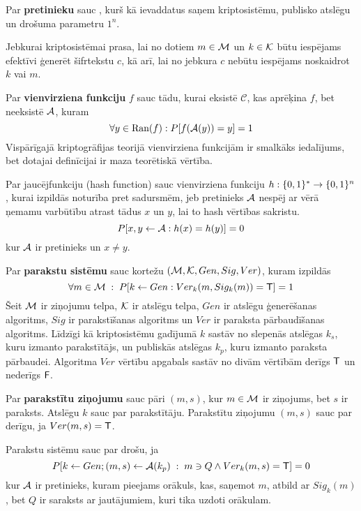Par \textbf{pretinieku} sauc \ppt{}, kurš kā ievaddatus saņem kriptosistēmu, publisko atslēgu un drošuma parametru $1^n$.

Jebkurai kriptosistēmai prasa, lai no dotiem $m\in\mathcal{M}$ un $k\in\mathcal{K}$ būtu iespējams efektīvi ģenerēt šifrtekstu $c$, kā arī, lai no jebkura $c$ nebūtu iespējams noskaidrot $k$ vai $m$.

Par \textbf{vienvirziena funkciju} $f$ sauc tādu, kurai eksistē \ppt{} $\mathcal{C}$, kas aprēķina $f$, bet neeksistē \ppt{} $\mathcal{A}$, kuram 
$$ \forall y \in \text{Ran}(f): P[f(\mathcal{A}(y)) = y] = 1 $$
Vispārīgajā kriptogrāfijas teorijā vienvirziena funkcijām ir smalkāks iedalījums, bet dotajai definīcijai ir maza teorētiskā vērtība.

Par jaucējfunkciju (hash function) sauc vienvirziena funkciju $h: \{0,1\}^* \to \{0,1\}^n$, kurai izpildās noturība pret sadursmēm, jeb pretinieks $\mathcal{A}$ nespēj ar vērā ņemamu varbūtību atrast tādus $x$ un $y$, lai to hash vērtības sakristu.
\begin{equation*}
    P[x, y \leftarrow \mathcal{A} : h(x) = h(y)] = 0
\end{equation*}
kur $\mathcal{A}$ ir pretinieks un $x\neq y$.

Par \textbf{parakstu sistēmu} sauc kortežu $(\mathcal{M}, \mathcal{K}, Gen, Sig, Ver)$, kuram izpildās
\begin{equation*}
    \forall m \in \mathcal{M} \;:\; P[k \leftarrow Gen: Ver_k(m, Sig_k(m))=\textsf{T}] = 1
\end{equation*}
Šeit $\mathcal{M}$ ir ziņojumu telpa, $\mathcal{K}$ ir atslēgu telpa, $Gen$ ir atslēgu ģenerēšanas algoritms, $Sig$ ir parakstīšanas algoritms un $Ver$ ir paraksta pārbaudīšanas algoritms. Līdzīgi kā kriptosistēmu gadījumā $k$ sastāv no slepenās atslēgas $k_s$, kuru izmanto parakstītājs, un publiskās atslēgas $k_p$, kuru izmanto paraksta pārbaudei. Algoritma $Ver$ vērtību apgabals sastāv no divām vērtībām \textemdash{} derīgs $\textsf{T}$ un nederīgs $\textsf{F}$.

Par \textbf{parakstītu ziņojumu} sauc pāri $(m, s)$, kur $m\in \mathcal{M}$ ir ziņojums, bet $s$ ir paraksts. Atslēgu $k$ sauc par parakstītāju. Parakstītu ziņojumu $(m,s)$ sauc par derīgu, ja $Ver(m,s) =\textsf{T}$.

Parakstu sistēmu sauc par drošu, ja
\begin{equation*}
    P[k \leftarrow Gen; (m,s) \leftarrow \mathcal{A} (k_p)\;:\; m\ni Q \wedge Ver_k(m,s) =\textsf{T}] = 0
\end{equation*}
kur $\mathcal{A}$ ir pretinieks, kuram pieejams orākuls, kas, saņemot $m$, atbild ar $Sig_k(m)$, bet $Q$ ir saraksts ar jautājumiem, kuri tika uzdoti orākulam.\cite[p.~135]{pass10}

